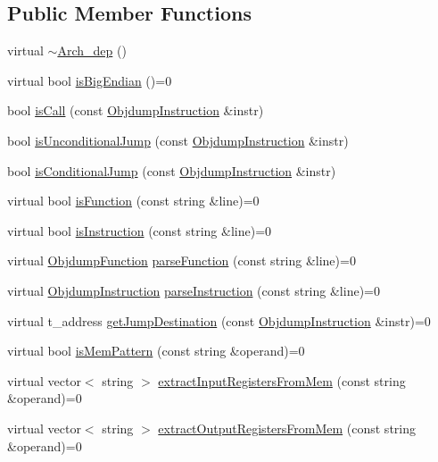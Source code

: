 \subsection*{Public Member Functions}
\begin{DoxyCompactItemize}
\item 
virtual \hyperlink{classArch__dep_ace6563eaed5469d5c65d1373dbf6e1cd}{$\sim$\+Arch\+\_\+dep} ()
\item 
virtual bool \hyperlink{classArch__dep_a2734ff9ad6b2d894a2573eaedcd46989}{is\+Big\+Endian} ()=0
\item 
bool \hyperlink{classArch__dep_a0e7d21d956903e11000d78cab233c24d}{is\+Call} (const \hyperlink{classObjdumpInstruction}{Objdump\+Instruction} \&instr)
\item 
bool \hyperlink{classArch__dep_ac03cfb1337393303f438f7915bcc23a9}{is\+Unconditional\+Jump} (const \hyperlink{classObjdumpInstruction}{Objdump\+Instruction} \&instr)
\item 
bool \hyperlink{classArch__dep_ac1df28408e3ed4390827a8922d833383}{is\+Conditional\+Jump} (const \hyperlink{classObjdumpInstruction}{Objdump\+Instruction} \&instr)
\item 
virtual bool \hyperlink{classArch__dep_ae876048f1f6ac62a6f7cb84067189866}{is\+Function} (const string \&line)=0
\item 
virtual bool \hyperlink{classArch__dep_ac537200db0a4cdd0eb3321b65111ccd5}{is\+Instruction} (const string \&line)=0
\item 
virtual \hyperlink{classObjdumpFunction}{Objdump\+Function} \hyperlink{classArch__dep_a5d004c41d6eaf7975b69f767a52d2e30}{parse\+Function} (const string \&line)=0
\item 
virtual \hyperlink{classObjdumpInstruction}{Objdump\+Instruction} \hyperlink{classArch__dep_a6408104eb77881932f05dab9e913ca87}{parse\+Instruction} (const string \&line)=0
\item 
virtual t\+\_\+address \hyperlink{classArch__dep_a78780a4581807e2974057810e6aaa6c1}{get\+Jump\+Destination} (const \hyperlink{classObjdumpInstruction}{Objdump\+Instruction} \&instr)=0
\item 
virtual bool \hyperlink{classArch__dep_aa965a7ac1af14109f60aa2ceab99b6d6}{is\+Mem\+Pattern} (const string \&operand)=0
\item 
virtual vector$<$ string $>$ \hyperlink{classArch__dep_a02bb8952fdf52e2a11ca009509b7bf46}{extract\+Input\+Registers\+From\+Mem} (const string \&operand)=0
\item 
virtual vector$<$ string $>$ \hyperlink{classArch__dep_a4ef649eb06dedb67fe215fc7665f48ba}{extract\+Output\+Registers\+From\+Mem} (const string \&operand)=0

\end{DoxyCompactItemize}
